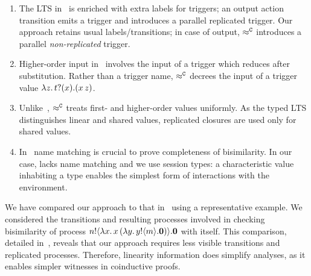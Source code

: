 \documentclass[a4paper,UKenglish]{lipics}
\theoremstyle{definition}
\begin{document}
\begin{enumerate}[$\bullet$]
\item 
The LTS in~\cite{JeffreyR05} is enriched with extra labels for triggers;
an output action transition emits a trigger and introduces a parallel replicated trigger.
Our 
approach retains usual labels/transitions; in  case of output,
$\approx^\mathtt{C}$
introduces a parallel
\emph{non-replicated} trigger.

\item Higher-order input in~\cite{JeffreyR05} involves 
the input of a trigger which reduces after substitution.
Rather than a trigger name, %
$\approx^\mathtt{C}$
decrees the input of a trigger value $\lambda z.\,t ? (x) . (x\, {z})$.

\item Unlike~\cite{JeffreyR05}, 
$\approx^\mathtt{C}$ treats  
first- and higher-order values uniformly. %
As the typed LTS distinguishes linear and shared values,
replicated closures are used only for shared values.

\item In~\cite{JeffreyR05}   name matching   is
crucial to prove completeness of bisimilarity.
In our case, \HOp lacks name matching and 
we use session types: a characteristic value inhabiting a type enables the simplest form of interactions with the environment.


\end{enumerate}
\noi 
We have compared our approach to that in~\cite{JeffreyR05} 
using a representative example.
We considered the transitions and resulting processes involved in checking bisimilarity of process 
$n ! \langle \lambda x.\,x\, {(}\lambda y.\,y ! \langle m \rangle . \mathbf{0}) \rangle . \mathbf{0}$
with itself.
This comparison, detailed in~\cite{KouzapasPY15}, reveals that our approach 
requires less visible transitions and replicated processes. 
Therefore, linearity information does simplify analyses, 
as it enables simpler witnesses in  coinductive proofs.
\end{document}
